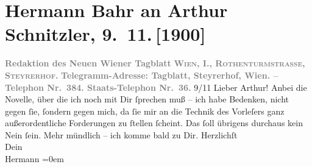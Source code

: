 

         \renewcommand{\erwaehnteInstitutionen}{Institutionen: Neues Wiener Tagblatt}
         \renewcommand{\erwaehnteOrte}{Orte: Steyrerhof, Wien}
         \renewcommand{\erwaehnteWerke}{Werke: Lieutenant Gustl. Novelle}
               \section[Hermann Bahr an Arthur Schnitzler, 9. 11. {[}1900{]}]{ Hermann Bahr an Arthur Schnitzler, 9. 11. {[}1900{]}}\nopagebreak{}\rehead{ }\begin{ledgroupsized}[t]{13cm}\normalsize\beginnumbering \toendnotes[C]{\smallbreak\pagebreak[2]} 
\toendnotes[C]{\smallbreak}\pstart
           \noindent{}\centering{}{\pb}\textcolor{gray}{\textbf{Redaktion des Neuen Wiener
                        Tagblatt}}\pend
           \pstart
           \noindent{}\centering{}\textcolor{gray}{\textbf{\textsc{Wien, I., Rothenturmstrasse,
                        Steyrerhof.}}}\pend
           \pstart
           \noindent{}\centering{}\textcolor{gray}{\textbf{Telegramm-Adresse: Tagblatt, Steyrerhof, Wien. – Telephon Nr. 384. Staats-Telephon
                     Nr. 36.}}\pend
           \pstart
           \raggedleft{}9/11\pend
           \pstart\center{}Lieber Arthur!\pend\pstart
           Anbei die Novelle, über die
               ich noch mit Dir ſprechen muß – ich habe Bedenken, nicht gegen ſie, ſondern gegen
               mich, da ſie mir an die Technik des Vorleſers ganz außerordentliche Forderungen zu
               ſtellen ſcheint. Das ſoll übrigens durchaus kein Nein ſein. Mehr mündlich – ich komme
               bald zu Dir.\pend
           \pstart
           Herzlichſt{\\[\baselineskip]}Dein{\\[\baselineskip]}\spacefill\mbox{Hermann}\pend
           \leftskip=0em{}
         
         \endnumbering{}\end{ledgroupsized}  \newcommand{\dateiname}{L01082}\newcommand{\titel}{Hermann Bahr an Arthur Schnitzler, 9. 11. [1900]}\newcommand{\editorInnen}{ Kurt Ifkovits,  Martin Anton Müller}
      